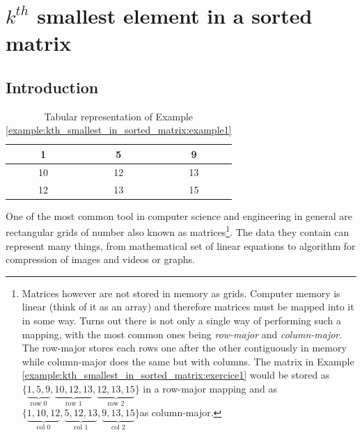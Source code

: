 %



\chapter{$k^{th}$ smallest element in a sorted matrix}
\label{ch:kth_smallest_in_sorted_matrix}
\section*{Introduction}
\begin{table}
    \centering
    \begin{framed}  
    \begin{tabular}{|c|c|c|}
    \hline
    1  & 5  & 9  \\ \hline
    10 & 12 & 13 \\ \hline
    12 & 13 & 15 \\ \hline
\end{tabular}%
\caption{Tabular representation of Example \ref{example:kth_smallest_in_sorted_matrix:example1}}
\label{tab:kth_smallest_in_sorted_matrix:example1}
\end{framed}
\end{table} 

One of the most common tool in computer science and engineering in general are rectangular grids of number also known as matrices\footnote{Matrices however are not stored in memory as grids. Computer memory is linear (think of it as an array) and therefore matrices must be mapped into it in some way. Turns out there is not only a single way of performing such a mapping, with the most common ones being \textit{row-major} and \textit{column-major}. The row-major stores each rows one after the other contiguously in memory  while column-major does the same but with columns. The matrix in Example \ref{example:kth_smallest_in_sorted_matrix:exercice1} would be stored as $\{\underbrace{1,5,9}_{\text{row 0}},\underbrace{10,12,13}_{\text{row 1}},\underbrace{12,13,15}_{\text{row 2}}\}$ in a row-major mapping and as $\{\underbrace{1,10,12}_{\text{col 0}},\underbrace{5,12,13}_{\text{col 1}},\underbrace{9,13,15}_{\text{col 2}}\}$as column-major.}. The data they  contain can represent many things, from mathematical set of linear equations to algorithm for compression of images and videos or graphs.


